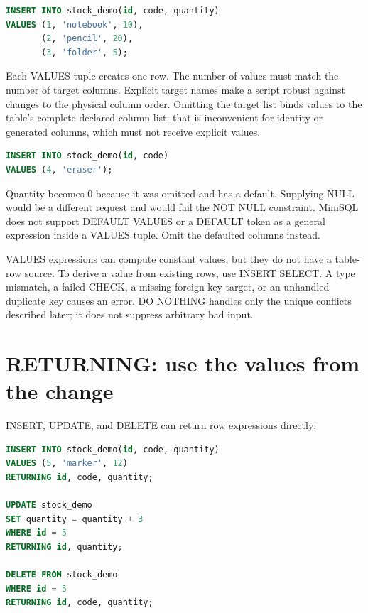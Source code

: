 \begin{lstlisting}[language=SQL]
INSERT INTO stock_demo(id, code, quantity)
VALUES (1, 'notebook', 10),
       (2, 'pencil', 20),
       (3, 'folder', 5);
\end{lstlisting}

Each VALUES tuple creates one row. The number of values must match the number of target columns. Explicit target names make a script robust against changes to the physical column order. Omitting the target list binds values to the table's complete declared column list; that is inconvenient for identity or generated columns, which must not receive explicit values.

\begin{lstlisting}[language=SQL]
INSERT INTO stock_demo(id, code)
VALUES (4, 'eraser');
\end{lstlisting}

Quantity becomes 0 because it was omitted and has a default. Supplying NULL would be a different request and would fail the NOT NULL constraint. MiniSQL does not support DEFAULT VALUES or a DEFAULT token as a general expression inside a VALUES tuple. Omit the defaulted columns instead.

VALUES expressions can compute constant values, but they do not have a table-row source. To derive a value from existing rows, use INSERT SELECT. A type mismatch, a failed CHECK, a missing foreign-key target, or an unhandled duplicate key causes an error. DO NOTHING handles only the unique conflicts described later; it does not suppress arbitrary bad input.


\section{RETURNING: use the values from the change}
\label{sql:returning}

INSERT, UPDATE, and DELETE can return row expressions directly:

\begin{lstlisting}[language=SQL]
INSERT INTO stock_demo(id, code, quantity)
VALUES (5, 'marker', 12)
RETURNING id, code, quantity;

UPDATE stock_demo
SET quantity = quantity + 3
WHERE id = 5
RETURNING id, quantity;

DELETE FROM stock_demo
WHERE id = 5
RETURNING id, code, quantity;
\end{lstlisting}

